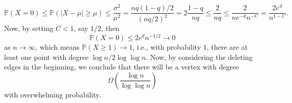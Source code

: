 \begin{answer}
	\[
		\mathbb{P} (X = 0)
		\leq \mathbb{P} (\vert X - \mu \vert \geq \mu )
		\leq \frac{\sigma ^2}{\mu ^2}
		= \frac{nq(1-q) / 2}{(nq / 2)^2}
		= 2 \frac{1 - q}{nq}
		\leq \frac{2}{nq}
		\leq \frac{2}{n e^{-d} n^{-C}}
		= \frac{2e^d}{n^{1 - C}}.
	\]
	Now, by setting \(C < 1\), say \(1 / 2\), then
	\[
		\mathbb{P} (X=0) \leq 2e^d n^{-1 / 2} \to 0
	\]
	as \(n \to \infty \), which means \(\mathbb{P} (X \geq 1) \to 1\), i.e., with probability \(1\), there are at least one point with degree \(\log n / 2 \log \log n \). Now, by considering the deleting edges in the beginning, we conclude that there will be a vertex with degree
	\[
		\Omega \left( \frac{\log n}{\log \log n} \right)
	\]
	with overwhelming probability.
\end{answer}